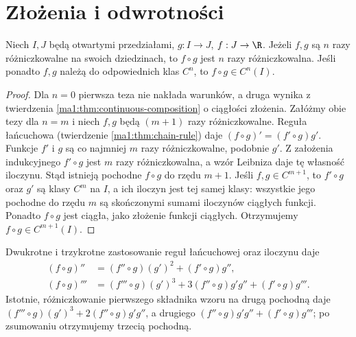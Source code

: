 \section{Złożenia i odwrotności}
\begin{twierdzenie}
\label{ma1:thm:higher-composition}
Niech $I,J$ będą otwartymi przedziałami, $g:I\to J$, $f:J\to\R$. Jeżeli $f,g$ są $n$ razy różniczkowalne na swoich dziedzinach, to $f\circ g$ jest $n$ razy różniczkowalna. Jeśli ponadto $f,g$ należą do odpowiednich klas $C^n$, to $f\circ g\in C^n(I)$.
\end{twierdzenie}
\begin{proof}
Dla $n=0$ pierwsza teza nie nakłada warunków, a druga wynika z twierdzenia \ref{ma1:thm:continuous-composition} o ciągłości złożenia. Załóżmy obie tezy dla $n=m$ i niech $f,g$ będą $(m+1)$ razy różniczkowalne. Reguła łańcuchowa (twierdzenie \ref{ma1:thm:chain-rule}) daje $(f\circ g)'=(f'\circ g)g'$. Funkcje $f'$ i $g$ są co najmniej $m$ razy różniczkowalne, podobnie $g'$. Z założenia indukcyjnego $f'\circ g$ jest $m$ razy różniczkowalna, a wzór Leibniza daje tę własność iloczynu. Stąd istnieją pochodne $f\circ g$ do rzędu $m+1$. Jeśli $f,g\in C^{m+1}$, to $f'\circ g$ oraz $g'$ są klasy $C^m$ na $I$, a ich iloczyn jest tej samej klasy: wszystkie jego pochodne do rzędu $m$ są skończonymi sumami iloczynów ciągłych funkcji. Ponadto $f\circ g$ jest ciągła, jako złożenie funkcji ciągłych. Otrzymujemy $f\circ g\in C^{m+1}(I)$.
\end{proof}
Dwukrotne i trzykrotne zastosowanie reguł łańcuchowej oraz iloczynu daje
\[
 \begin{aligned}
 (f\circ g)''&=(f''\circ g)(g')^2+(f'\circ g)g'',\\
 (f\circ g)'''&=(f'''\circ g)(g')^3
     +3(f''\circ g)g'g''+(f'\circ g)g'''.
 \end{aligned}
\]
Istotnie, różniczkowanie pierwszego składnika wzoru na drugą pochodną daje $(f'''\circ g)(g')^3+2(f''\circ g)g'g''$, a drugiego $(f''\circ g)g'g''+(f'\circ g)g'''$; po zsumowaniu otrzymujemy trzecią pochodną.

